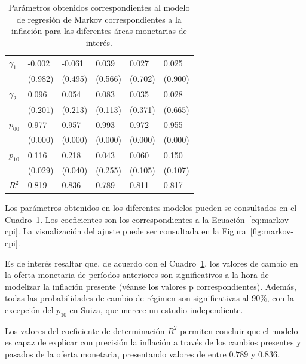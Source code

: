 \documentclass[titlepage, 12pt]{article}
\begin{document}
\begin{table}
\begin{tabular}{llllll}
        $\gamma_1$        & -0.002         & -0.061   & 0.039   & 0.027       & 0.025   \\
                          & (0.982)        & (0.495)  & (0.566) & (0.702)     & (0.900) \\
        $\gamma_2$        & 0.096          & 0.054    & 0.083   & 0.035       & 0.028   \\
                          & (0.201)        & (0.213)  & (0.113) & (0.371)     & (0.665) \\
        $p_{00}$          & 0.977          & 0.957    & 0.993   & 0.972       & 0.955   \\
                          & (0.000)        & (0.000)  & (0.000) & (0.000)     & (0.000) \\
        $p_{10}$          & 0.116          & 0.218    & 0.043   & 0.060       & 0.150   \\
                          & (0.029)        & (0.040)  & (0.255) & (0.105)     & (0.107) \\
        $R^2$             & 0.819          & 0.836    & 0.789   & 0.811       & 0.817   \\
        \bottomrule
    \end{tabular}
    \caption{Parámetros obtenidos correspondientes al modelo de regresión de Markov correspondientes a la inflación para las diferentes áreas monetarias de interés.}
    \label{tab:cpi-markov-params}
\end{table}


Los parámetros obtenidos en los diferentes modelos pueden se consultados en el Cuadro~\ref{tab:cpi-markov-params}. Los coeficientes son los correspondientes a la Ecuación~\ref{eq:markov-cpi}. La visualización del ajuste puede ser consultada en la Figura~\ref{fig:markov-cpi}.

Es de interés resaltar que, de acuerdo con el Cuadro~\ref{tab:cpi-markov-params}, los valores de cambio en la oferta monetaria de períodos anteriores son significativos a la hora de modelizar la inflación presente (véanse los valores p correspondientes). Además, todas las probabilidades de cambio de régimen son significativas al 90\%, con la excepción del $p_{10}$ en Suiza, que merece un estudio independiente.

Los valores del coeficiente de determinación $R^2$ permiten concluir que el modelo es capaz de explicar con precisión la inflación a través de los cambios presentes y pasados de la oferta monetaria, presentando valores de entre $0.789$ y $0.836$.
\end{document}
